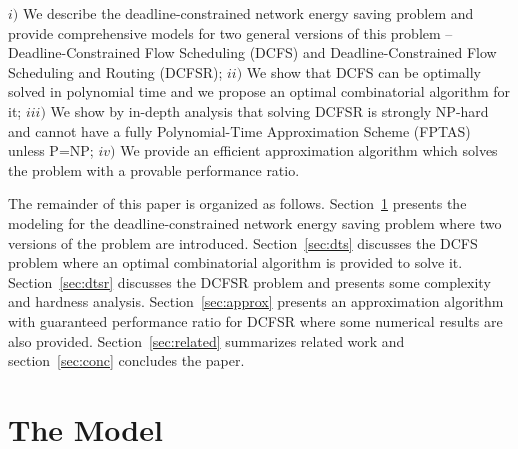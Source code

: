 \documentclass[10pt, conference, compsocconf]{IEEEtran}
\begin{document}
\iffalse
\begin{itemize}
\item We describe the deadline-constrained network energy saving problem in a comprehensive way and provide models for two general versions of this problem -- Deadline-Constrained Flow Scheduling (DCFS) and Deadline-Constrained Flow Scheduling and Routing (DCFSR);
\item We show that DCFS can be optimally solved in polynomial time and we propose an optimal combinatorial algorithm for it;
\item We show by in-depth analysis that solving DCFSR is strongly NP-hard and cannot have a Polynomial-Time Approximation Scheme (PTAS); and
\item We provide an efficient approximation algorithm which solves the problem with a provable performance ratio.
\end{itemize}
\fi
$\mathit{i})$ We describe the deadline-constrained network energy saving problem and provide comprehensive models for two general versions of this problem -- Deadline-Constrained Flow Scheduling (DCFS) and Deadline-Constrained Flow Scheduling and Routing (DCFSR); $\mathit{ii})$ We show that DCFS can be optimally solved in polynomial time and we propose an optimal combinatorial algorithm for it; $\mathit{iii})$ We show by in-depth analysis that solving DCFSR is strongly NP-hard and cannot have a fully Polynomial-Time Approximation Scheme (FPTAS) unless P=NP; $\mathit{iv})$ We provide an efficient approximation algorithm which solves the problem with a provable performance ratio.

The remainder of this paper is organized as follows. Section~\ref{sec:model} presents the modeling for the deadline-constrained network energy saving problem where two versions of the problem are introduced. Section~\ref{sec:dts} discusses the DCFS problem where an optimal combinatorial algorithm is provided to solve it. Section~\ref{sec:dtsr} discusses the DCFSR problem and presents some complexity and hardness analysis. Section~\ref{sec:approx} presents an approximation algorithm with guaranteed performance ratio for DCFSR where some numerical results are also provided. Section~\ref{sec:related} summarizes related work and section~\ref{sec:conc} concludes the paper.


\section{The Model}
\label{sec:model}
\end{document}
